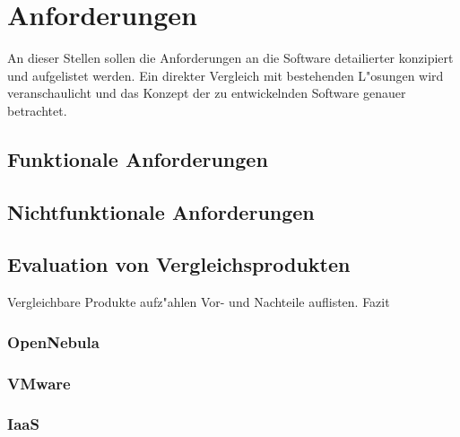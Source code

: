 \chapter{Anforderungen}
An dieser Stellen sollen die Anforderungen an die Software detailierter konzipiert und aufgelistet werden.\newline
Ein direkter Vergleich mit bestehenden L"osungen wird veranschaulicht und das Konzept der zu entwickelnden Software genauer betrachtet.


\section{Funktionale Anforderungen}

\section{Nichtfunktionale Anforderungen}


\section{Evaluation von Vergleichsprodukten}
Vergleichbare Produkte aufz"ahlen
Vor- und Nachteile auflisten.
Fazit
\subsection{OpenNebula}

\subsection{VMware}

\subsection{IaaS}

